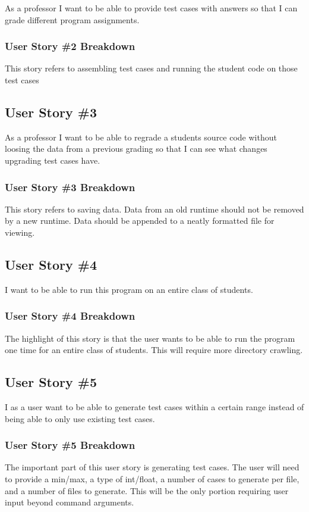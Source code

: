As a professor I want to be able to provide test cases with answers so that I can grade different program assignments.

\subsubsection{User Story \#2 Breakdown}
This story refers to assembling test cases and running the student code on those test cases

\subsection{User Story \#3} 

As a professor I want to be able to regrade a students source code without loosing the data from a previous
grading so that I can see what changes upgrading test cases have.

\subsubsection{User Story \#3 Breakdown}
This story refers to saving data. Data from an old runtime should not be removed by a new runtime. Data should be appended to a neatly formatted file for viewing.

\subsection{User Story \#4}
I want to be able to run this program on an entire class of students.

\subsubsection{User Story \#4 Breakdown}
The highlight of this story is that the user wants to be able to run the program one time for an entire class of students. This will require more directory crawling.

\subsection{User Story \#5}
I as a user want to be able to generate test cases within a certain range instead of being able to only use existing test cases.

\subsubsection{User Story \#5 Breakdown}
The important part of this user story is generating test cases. The user will need to provide a min/max, a type of int/float, a number of cases to generate per file, and a number of files to generate. This will be the only portion requiring user input beyond command arguments.

